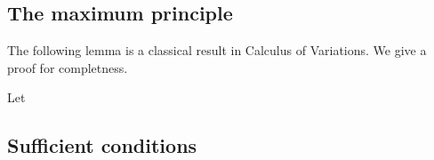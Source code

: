 \subsection{The maximum principle}


The following lemma is a classical result in Calculus of Variations. We give a proof for completness.

\begin{lemma}\label{VariatLemma} Let  

\end{lemma}




\subsection{Sufficient conditions}






